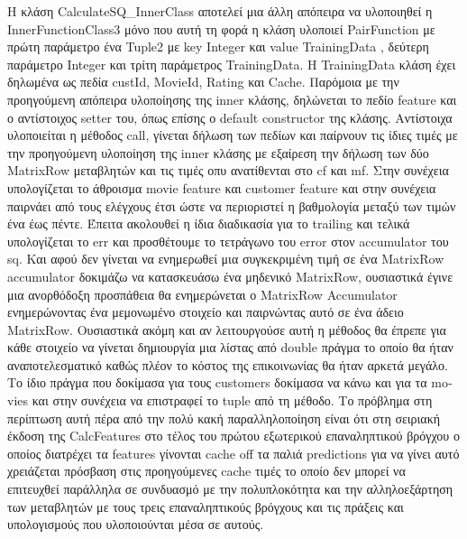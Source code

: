 \documentclass{report}
\begin{document}
{H κλάση \textlatin{CalculateSQ\_InnerClass} αποτελεί μια άλλη απόπειρα να υλοποιηθεί η \textlatin{InnerFunctionClass3} μόνο
που αυτή τη φορά η κλάση υλοποιεί \textlatin{PairFunction} με πρώτη παράμετρο ένα \textlatin{Tuple2} με \textlatin{key} \textlatin{Integer} και \textlatin{value TrainingData} , δεύτερη παράμετρο \textlatin{Integer} και τρίτη παράμετρος \textlatin{TrainingData}. 
H \textlatin{TrainingData} κλάση έχει δηλωμένα ως πεδία \textlatin{custId, MovieId, Rating} και \textlatin{Cache}. Παρόμοια με την προηγούμενη απόπειρα υλοποίησης της \textlatin{inner} κλάσης, δηλώνεται το πεδίο \textlatin{feature} και ο αντίστοιχος \textlatin{setter} του, 
όπως επίσης ο \textlatin{default} \textlatin{constructor} της κλάσης. Αντίστοιχα υλοποιείται η μέθοδος \textlatin{call}, γίνεται δήλωση των πεδίων και παίρνουν τις ίδιες τιμές με την προηγούμενη υλοποίηση της \textlatin{inner} κλάσης με εξαίρεση την δήλωση των δύο \textlatin{MatrixRow} μεταβλητών και τις τιμές οπυ ανατίθενται στο \textlatin{cf} και \textlatin{mf}. Στην συνέχεια υπολογίζεται το άθροισμα \textlatin{movie feature} και \textlatin{customer feature} και στην συνέχεια παιρνάει από τους ελέγχους έτσι ώστε να περιοριστεί η βαθμολογία μεταξύ των τιμών ένα έως πέντε. Έπειτα ακολουθεί η ίδια διαδικασία για το \textlatin{trailing } και τελικά 
υπολογίζεται το \textlatin{err} και προσθέτουμε το τετράγωνο του \textlatin{error} στον \textlatin{accumulator} του \textlatin{sq}. Και αφού δεν γίνεται να ενημερωθεί μια συγκεκριμένη τιμή σε ένα \textlatin{MatrixRow accumulator} δοκιμάζω να κατασκευάσω ένα μηδενικό \textlatin{MatrixRow}, ουσιαστικά έγινε μια ανορθόδοξη προσπάθεια θα ενημερώνεται ο \textlatin{MatrixRow Accumulator} ενημερώνοντας ένα μεμονωμένο στοιχείο και παιρνώντας αυτό σε ένα άδειο \textlatin{MatrixRow}. Ουσιαστικά ακόμη και αν λειτουργούσε αυτή η μέθοδος θα έπρεπε για κάθε στοιχείο να γίνεται δημιουργία μια λίστας από \textlatin{double} πράγμα το οποίο θα ήταν αναποτελεσματικό καθώς πλέον το κόστος της επικοινωνίας θα ήταν αρκετά μεγάλο. Το ίδιο πράγμα που δοκίμασα για τους \textlatin{customers} δοκίμασα να κάνω και για τα \textlatin{movies} και στην συνέχεια να επιστραφεί το \textlatin{tuple} από τη μέθοδο. Το πρόβλημα στη περίπτωση αυτή πέρα από την πολύ κακή παραλληλοποίηση είναι ότι στη σειριακή έκδοση της \textlatin{CalcFeatures} στο τέλος του πρώτου εξωτερικού επαναληπτικού βρόγχου ο οποίος διατρέχει τα \textlatin{features} γίνονται \textlatin{cache off} τα παλιά \textlatin{predictions} για να γίνει αυτό χρειάζεται πρόσβαση στις προηγούμενες \textlatin{cache} τιμές το οποίο δεν μπορεί να επιτευχθεί παράλληλα σε συνδυασμό με την πολυπλοκότητα και την αλληλοεξάρτηση των μεταβλητών με τους τρεις επαναληπτικούς βρόγχους και τις πράξεις και υπολογισμούς που υλοποιούνται μέσα σε αυτούς.


}
\end{document}
